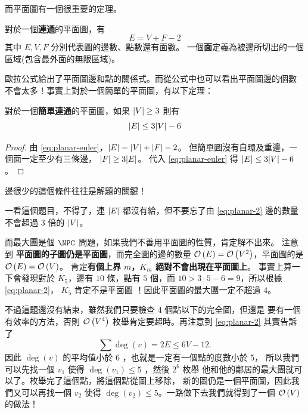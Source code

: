 \documentclass[a4paper,12pt]{book}
\begin{document}
而平面圖有一個很重要的定理。
\begin{theorem}[定理 (歐拉定理)]
  對於一個{\bf 連通}的平面圖，有
  \begin{equation}
    E = V + F - 2 \label{eq:planar-euler}
  \end{equation}
  其中 $E, V, F$ 分別代表圖的邊數、點數還有面數。
  一個{\bf 面}定義為被邊所切出的一個區域(包含最外面的無限區域)。
\end{theorem}
歐拉公式給出了平面圖邊和點的關係式。而從公式中也可以看出平面圖邊的個數
不會太多！事實上對於一個簡單的平面圖，有以下定理：
\begin{theorem}[定理]
  對於一個{\bf 簡單連通}的平面圖，如果 $\lvert V \rvert \geq 3$ 則有
  \begin{equation}
    \lvert E \rvert \leq 3\lvert V \rvert - 6 \label{eq:planar-2}
  \end{equation}
\end{theorem}
\begin{proof}
  由 \eqref{eq:planar-euler}，$\lvert E \rvert = \lvert V \rvert + \lvert F \rvert - 2$。
  但簡單圖沒有自環及重邊，一個面一定至少有三條邊， $\lvert F \rvert \geq 3 \lvert E \rvert$。
  代入 \eqref{eq:planar-euler} 得 $\lvert E \rvert \leq 3 \lvert V \rvert - 6$。
\end{proof}

邊很少的這個條件往往是解題的關鍵！

一看這個題目，不得了，連 $\lvert E \rvert$ 都沒有給，但不要忘了由 \eqref{eq:planar-2}
邊的數量不會超過 $3$ 倍的 $\lvert V \rvert$。 

而最大團是個 $\NPC$ 問題，如果我們不善用平面圖的性質，肯定解不出來。
注意到 {\bf 平面圖的子圖仍是平面圖}，而完全圖的邊的數量 
$\operatorname{\mathcal{O}}\left(E\right) = \operatorname{\mathcal{O}}\left(V^2\right)$，平面圖的是 $\operatorname{\mathcal{O}}\left(E\right) = \operatorname{\mathcal{O}}\left(V\right)$。
肯定{\bf 有個上界 $m$，$K_m$ 絕對不會出現在平面圖上}。
事實上算一下會發現對於 $K_5$，邊有 $10$ 條，點有 $5$ 個，而
$10 > 3 \cdot 5 - 6 = 9$，所以根據 \eqref{eq:planar-2}， $K_5$ 肯定不是平面圖
！因此平面圖的最大團一定不超過 $4$。

不過這題還沒有結束，雖然我們只要檢查 $4$ 個點以下的完全圖，但還是
要有一個有效率的方法，否則 $\operatorname{\mathcal{O}}\left(V^4\right)$ 枚舉肯定要超時。再注意到
\eqref{eq:planar-2} 其實告訴了
\[ \sum \deg(v) = 2E \leq 6V - 12.\]
因此 $\deg(v)$ 的平均值小於 $6$ ，也就是一定有一個點的度數小於 $5$，
所以我們可以先找一個 $v_1$ 使得 $\deg(v_1) \leq 5$ ，然後 $2^6$ 枚舉
他和他的鄰居的最大團就可以了。枚舉完了這個點，將這個點從圖上移除，
新的圖仍是一個平面圖，因此我們又可以再找一個 $v_2$ 使得
$\deg(v_2) \leq 5$。一路做下去我們就得到了一個 $\operatorname{\mathcal{O}}\left(V\right)$ 的做法！
\end{document}

